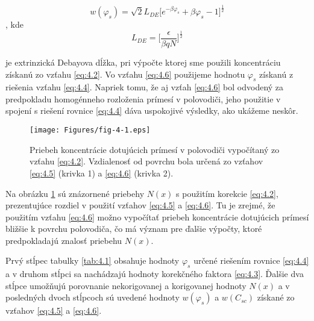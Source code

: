 \begin{equation}\label{eq:4.6}
w(\varphi_{s})=\sqrt{2}L_{DE}\Big[e^{-\beta\varphi_{s}}+\beta\varphi_{s}-1\Big]^{\frac{1}{2}}
\end{equation}
, kde 
\begin{equation}\label{eq:4.7}
L_{DE}=\Bigg[\frac{\epsilon}{\beta qN}\Bigg]^{\frac{1}{2}}
\end{equation}

je extrinzická Debayova dĺžka, pri výpočte ktorej sme použili
koncentráciu získanú zo vzťahu \ref{eq:4.2}.  Vo vzťahu \ref{eq:4.6}
použijeme hodnotu $\varphi_{s}$ získanú z riešenia vzťahu
\ref{eq:4.4}.  Napriek tomu, že aj vzťah \ref{eq:4.6} bol odvodený za
predpokladu homogénneho rozloženia prímesí v polovodiči, jeho použitie
v spojení s riešení rovnice \ref{eq:4.4} dáva uspokojivé výsledky, ako
ukážeme neskôr.

\begin{figure}[h!]\centering
\texttt{[image: Figures/fig-4-1.eps]}
\captionsetup{justification=raggedright, singlelinecheck=false}
\caption[Priebeh koncentrácie dotujúcich prímesí v polovodiči
  vypočítaný zo vzťahu \ref{eq:4.2}]{Priebeh koncentrácie dotujúcich
  prímesí v polovodiči vypočítaný zo vzťahu \ref{eq:4.2}. Vzdialenosť
  od povrchu bola určená zo vzťahov \ref{eq:4.5} (krivka 1) a
  \ref{eq:4.6} (krivka 2).}
\label{fig:4.1}
\end{figure}

Na obrázku \ref{fig:4.1} sú znázornené priebehy $N(x)$ s použitím
korekcie \ref{eq:4.2}, prezentujúce rozdiel v použití vzťahov
\ref{eq:4.5} a \ref{eq:4.6}. Tu je zrejmé, že použitím vzťahu
\ref{eq:4.6} možno vypočítať priebeh koncentrácie dotujúcich prímesí
bližšie k povrchu polovodiča, čo má význam pre ďalšie výpočty, ktoré
predpokladajú znalosť priebehu $N(x)$.

Prvý stĺpec tabulky \ref{tab:4.1} obsahuje hodnoty $\varphi_{s}$ určené
riešením rovnice \ref{eq:4.4} a v druhom stĺpci sa nachádzajú hodnoty
korekčného faktora \ref{eq:4.3}. Ďalšie dva stĺpce umožňujú porovnanie
nekorigovanej a korigovanej hodnoty $N(x)$ a v posledných dvoch
stĺpcoch sú uvedené hodnoty $w(\varphi_{s})$ a $w(C_{sc})$ získané zo
vzťahov \ref{eq:4.5} a \ref{eq:4.6}.

